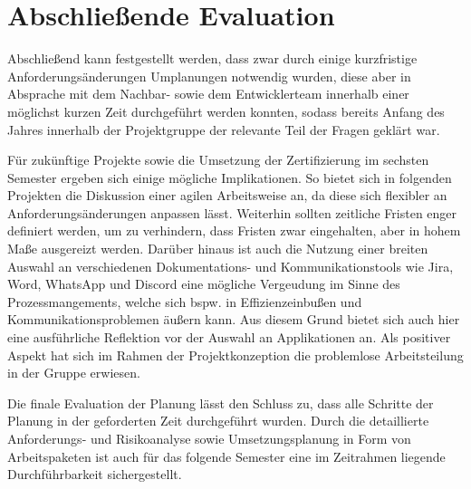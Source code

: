 \chapter{Abschließende Evaluation}
Abschließend kann festgestellt werden, dass zwar durch
einige kurzfristige Anforderungsänderungen Umplanungen notwendig
wurden, diese aber in Absprache mit dem Nachbar- sowie dem Entwicklerteam
innerhalb einer möglichst kurzen Zeit durchgeführt werden konnten, sodass
bereits Anfang des Jahres innerhalb der Projektgruppe der relevante Teil der Fragen geklärt war.

Für zukünftige Projekte sowie die Umsetzung der Zertifizierung im sechsten Semester ergeben sich einige
mögliche Implikationen. So bietet sich in folgenden Projekten die Diskussion einer agilen Arbeitsweise an,
da diese sich flexibler an Anforderungsänderungen anpassen lässt. Weiterhin sollten zeitliche Fristen enger
definiert werden, um zu verhindern, dass Fristen zwar eingehalten, aber in hohem Maße ausgereizt werden.
Darüber hinaus ist auch die Nutzung einer breiten Auswahl an verschiedenen Dokumentations-
und Kommunikationstools wie Jira, Word, WhatsApp und Discord eine mögliche Vergeudung im Sinne des Prozessmangements,
welche sich bspw. in Effizienzeinbußen und Kommunikationsproblemen äußern kann. Aus diesem Grund bietet sich auch hier
eine ausführliche Reflektion vor der Auswahl an Applikationen an. Als positiver Aspekt hat sich im Rahmen der Projektkonzeption
die problemlose Arbeitsteilung in der Gruppe erwiesen.

Die finale Evaluation der Planung lässt den Schluss zu, dass alle Schritte der Planung in der
geforderten Zeit durchgeführt wurden. Durch die detaillierte Anforderungs- und Risikoanalyse sowie
Umsetzungsplanung in Form von Arbeitspaketen ist auch für das folgende Semester eine im Zeitrahmen 
liegende Durchführbarkeit sichergestellt.